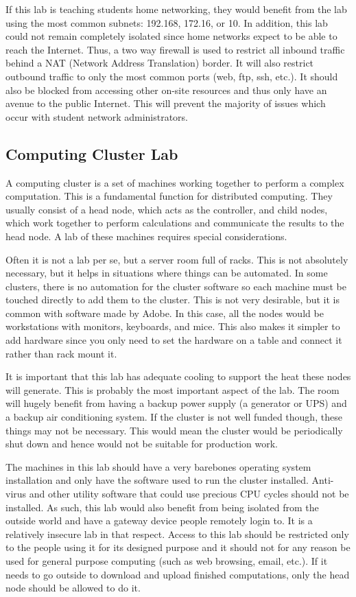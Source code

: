 If this lab is teaching students home networking, they would benefit from the lab using the most common subnets:  192.168, 172.16, or 10.  In addition, this lab could not remain completely isolated since home networks expect to be able to reach the Internet.  Thus, a two way firewall is used to restrict all inbound traffic behind a NAT (Network Address Translation) border.  It will also restrict outbound traffic to only the most common ports (web, ftp, ssh, etc.).  It should also be blocked from accessing other on-site resources and thus only have an avenue to the public Internet.  This will prevent the majority of issues which occur with student network administrators.   
\subsection{Computing Cluster Lab}
A computing cluster is a set of machines working together to perform a complex computation.  This is a fundamental function for distributed computing.  They usually consist of a head node, which acts as the controller, and child nodes, which work together to perform calculations and communicate the results to the head node.  A lab of these machines requires special considerations.  

Often it is not a lab per se, but a server room full of racks.  This is not absolutely necessary, but it helps in situations where things can be automated.  In some clusters, there is no automation for the cluster software so each machine must be touched directly to add them to the cluster.  This is not very desirable, but it is common with software made by Adobe.  In this case, all the nodes would be workstations with monitors, keyboards, and mice.  This also makes it simpler to add hardware since you only need to set the hardware on a table and connect it rather than rack mount it.  

It is important that this lab has adequate cooling to support the heat these nodes will generate.  This is probably the most important aspect of the lab.  The room will hugely benefit from having a backup power supply (a generator or UPS) and a backup air conditioning system.  If the cluster is not well funded though, these things may not be necessary.  This would mean the cluster would be periodically shut down and hence would not be suitable for production work.  

The machines in this lab should have a very barebones operating system installation and only have the software used to run the cluster installed.  Anti-virus and other utility software that could use precious CPU cycles should not be installed.  As such, this lab would also benefit from being isolated from the outside world and have a gateway device people remotely login to.  It is a relatively insecure lab in that respect.  Access to this lab should be restricted only to the people using it for its designed purpose and it should not for any reason be used for general purpose computing (such as web browsing, email, etc.).  If it needs to go outside to download and upload finished computations, only the head node should be allowed to do it.  

